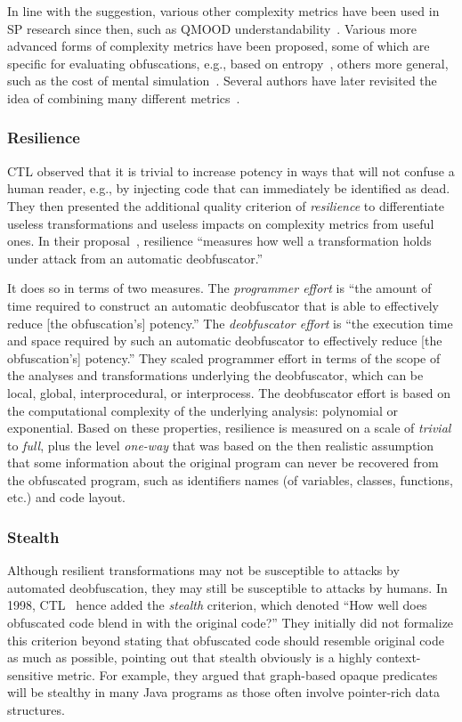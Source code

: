 In line with the suggestion, various other complexity metrics have been used in SP research since then, such as QMOOD understandability~\cite{Foket14,qmood}. Various more advanced forms of complexity metrics have been proposed, some of which are specific for evaluating obfuscations, e.g., based on entropy~\cite{entropy_metric}, others more general, such as the cost of mental simulation~\cite{mental_metrics}.
Several authors have later revisited the idea of combining many different metrics~\cite{anckaert,D4.06}.

\subsubsection{Resilience}
\label{sec:resilience}
CTL observed that it is trivial to increase potency in ways that will not confuse a human reader, e.g., by injecting code that can immediately be identified as dead. They then presented the additional quality criterion of \emph{resilience} to differentiate useless transformations and useless impacts on complexity metrics from useful ones. In their proposal~\cite{collberg1997taxonomy}, resilience ``measures how well a transformation holds under attack from an automatic deobfuscator.'' 

It does so in terms of two measures. The \emph{programmer effort} is ``the amount of time required to construct an automatic deobfuscator that is able to effectively reduce [the obfuscation's] potency.'' The \emph{deobfuscator effort} is ``the execution time and space required by such an automatic deobfuscator to effectively reduce [the obfuscation's] potency.'' They scaled programmer effort in terms of the scope of the analyses and transformations underlying the deobfuscator, which can be local, global, interprocedural, or interprocess. The deobfuscator effort is based on the computational complexity of the underlying analysis: polynomial or exponential. Based on these properties, resilience is measured on a scale of \emph{trivial} to \emph{full}, plus the level \emph{one-way} that was based on the then realistic assumption that some information about the original program can never be recovered from the obfuscated program, such as identifiers names (of variables, classes, functions, etc.) and code layout.

\subsubsection{Stealth}
Although resilient transformations may not be susceptible to attacks by automated deobfuscation, they may still be susceptible to attacks by humans. In 1998, CTL~\cite{collberg1998manufacturing} hence added the \emph{stealth} criterion, which denoted ``How well does obfuscated code blend in with the original code?'' They initially did not formalize this criterion beyond stating that obfuscated code should resemble original code as much as possible, pointing out that stealth obviously is a highly context-sensitive metric. For example, they argued that graph-based opaque predicates will be stealthy in many Java programs as those often involve pointer-rich data structures. %

